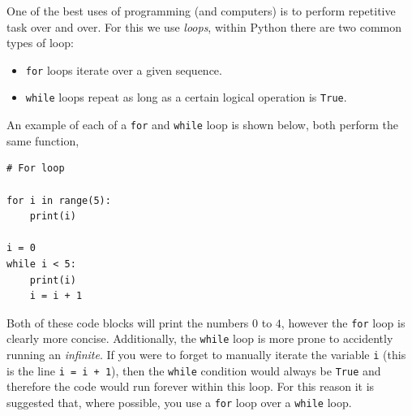 \documentclass[a4paper]{article}
\begin{document}
One of the best uses of programming (and computers) is to perform repetitive task over and over.
For this we use \emph{loops}, within Python there are two common types of loop:
\begin{itemize}
	\item{\texttt{for} loops iterate over a given sequence.}
	\item{\texttt{while} loops repeat as long as a certain logical operation is \texttt{True}.}
\end{itemize}
An example of each of a \texttt{for} and \texttt{while} loop is shown below, both perform the same function,
\begin{lstlisting}
# For loop

for i in range(5):
	print(i)

i = 0
while i < 5:
	print(i)
	i = i + 1
\end{lstlisting}
Both of these code blocks will print the numbers $0$ to $4$, however the \texttt{for} loop is clearly more concise.
Additionally, the \texttt{while} loop is more prone to accidently running an \emph{infinite}.
If you were to forget to manually iterate the variable \texttt{i} (this is the line \texttt{i = i + 1}), then the \texttt{while} condition would always be \texttt{True} and therefore the code would run forever within this loop.
For this reason it is suggested that, where possible, you use a \texttt{for} loop over a \texttt{while} loop.
\end{document}
